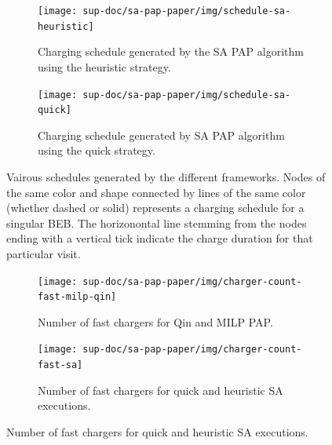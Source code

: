\documentclass[ee,thesis]{usuthesis}
\begin{document}
\begin{figure} \ContinuedFloat
  \centering

  \begin{subfigure}[t]{\textwidth}
    \centering \texttt{[image: sup-doc/sa-pap-paper/img/schedule-sa-heuristic]}
    \caption{Charging schedule generated by the SA PAP algorithm using the heuristic strategy.}
    \label{subfig:schedule-heuristic-sa}
  \end{subfigure}

  \hfill

  \begin{subfigure}[t]{\textwidth}
    \centering \texttt{[image: sup-doc/sa-pap-paper/img/schedule-sa-quick]}
    \caption{Charging schedule generated by SA PAP algorithm using the quick strategy.}
    \label{subfig:schedule-quick-sa}
  \end{subfigure}
  \caption{Vairous schedules generated by the different frameworks. Nodes of the same color and shape connected by lines of the same color (whether dashed or solid) represents a charging schedule for a singular BEB. The horizonontal line stemming from the nodes ending with a vertical tick indicate the charge duration for that particular visit.}
  \label{fig:schedule}
\end{figure}

\begin{figure}
    \begin{subfigure}[t]{\textwidth}
    \centering
        \texttt{[image: sup-doc/sa-pap-paper/img/charger-count-fast-milp-qin]}
        \caption{Number of fast chargers for Qin and MILP PAP.}
        \label{subfig:fast-charger-usage-milp-qinn}
    \end{subfigure}

    \begin{subfigure}[t]{\textwidth}
    \centering
        \texttt{[image: sup-doc/sa-pap-paper/img/charger-count-fast-sa]}
        \caption{Number of fast chargers for quick and heuristic SA executions.}
        \label{subfig:fast-charger-usage-sa}
    \end{subfigure}
\end{figure}
\end{document}
